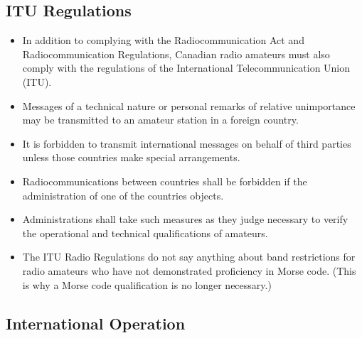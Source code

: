 \documentclass[letterpaper,12pt]{scrartcl}
\begin{document}
\subsection{ITU Regulations}

\begin{itemize}
\item In addition to complying with the Radiocommunication Act and Radiocommunication Regulations, Canadian radio amateurs must also comply with the 
regulations of the International Telecommunication Union (ITU).
\item Messages of a technical nature or personal remarks of relative unimportance may be transmitted to an amateur station in a foreign country.
\item It is forbidden to transmit international messages on behalf of third parties unless those countries make special arrangements.
\item Radiocommunications between countries shall be forbidden if the administration of one of the countries objects.
\item Administrations shall take such measures as they judge necessary to verify the operational and technical qualifications of amateurs.
\item The ITU Radio Regulations do not say anything about band restrictions for radio amateurs who have not demonstrated proficiency in Morse code.
(This is why a Morse code qualification is no longer necessary.)
\end{itemize}

\subsection{International Operation}
\end{document}
